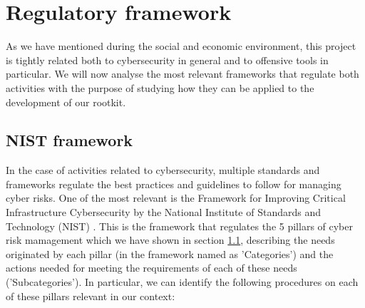 \section{Regulatory framework}
As we have mentioned during the social and economic environment, this project is tightly related both to cybersecurity in general and to offensive tools in particular. We will now analyse the most relevant frameworks that regulate both activities with the purpose of studying how they can be applied to the development of our rootkit.

\subsection{NIST framework}
In the case of activities related to cybersecurity, multiple standards and frameworks regulate the best practices and guidelines to follow for managing cyber risks. One of the most relevant is the Framework for Improving Critical Infrastructure Cybersecurity by the National Institute of Standards and Technology (NIST) \cite{nist_cyber}. This is the framework that regulates the 5 pillars of cyber risk mamagement which we have shown in section \ref{}, describing the needs originated by each pillar (in the framework named as 'Categories') and the actions needed for meeting the requirements of each of these needs ('Subcategories'). In particular, we can identify the following procedures on each of these pillars relevant in our context:

